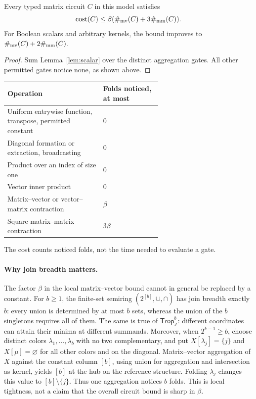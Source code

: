 \begin{lemma}\label{lem:typed-cost}
Every typed matrix circuit $C$ in this model satisfies
\[
 \operatorname{cost}(C)\le\beta(\#_{\mathrm{mv}}(C)+3\#_{\mathrm{mm}}(C)).
\]
For Boolean scalars and arbitrary kernels, the bound improves to
$\#_{\mathrm{mv}}(C)+2\#_{\mathrm{mm}}(C)$.
\end{lemma}
\begin{proof}
Sum Lemma~\ref{lem:scalar} over the distinct aggregation gates.
All other permitted gates notice none, as shown above.
\end{proof}
\begin{center}
\renewcommand{\arraystretch}{1.1}
\begin{tabular}{p{0.62\linewidth}l}
\toprule
Operation & Folds noticed, at most\\
\midrule
Uniform entrywise function, transpose, permitted constant & $0$\\
Diagonal formation or extraction, broadcasting & $0$\\
Product over an index of size one & $0$\\
Vector inner product & $0$\\
Matrix--vector or vector--matrix contraction & $\beta$\\
Square matrix--matrix contraction & $3\beta$\\
\bottomrule
\end{tabular}
\end{center}
The cost counts noticed folds, not the time needed to evaluate a gate.

\paragraph{Why join breadth matters.}
The factor $\beta$ in the local matrix--vector bound cannot in
general be replaced by a constant. For $b\ge1$, the finite-set
semiring $(2^{[b]},\cup,\cap)$ has join breadth exactly $b$:
every union is determined by at most $b$ sets, whereas the union
of the $b$ singletons requires all of them. The same is true of
$\mathsf{Trop}_{\mathbb Z}^{b}$: different coordinates can attain
their minima at different summands.
Moreover, when $2^{k-1}\ge b$, choose distinct colors
$\lambda_1,\ldots,\lambda_b$ with no two complementary, and put
$X[\lambda_j]=\{j\}$ and $X[\mu]=\varnothing$ for all other
colors and on the diagonal. Matrix--vector aggregation of $X$
against the constant column $[b]$, using union for aggregation
and intersection as kernel, yields $[b]$ at the hub on the
reference structure. Folding $\lambda_j$ changes this value to
$[b]\setminus\{j\}$. Thus one aggregation notices $b$ folds.
This is local tightness, not a claim that the overall circuit bound
is sharp in $\beta$.

